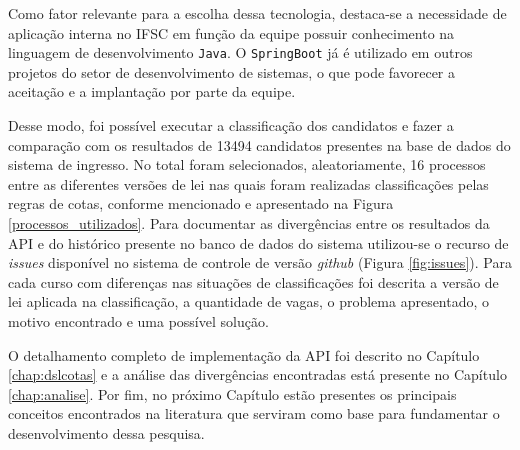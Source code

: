 Como fator relevante para a escolha dessa tecnologia, destaca-se a necessidade de aplicação interna no \gls{IFSC} em função da equipe possuir conhecimento na linguagem de desenvolvimento \texttt{Java}. O \texttt{SpringBoot} já é utilizado em outros projetos do setor de desenvolvimento de sistemas, o que pode favorecer a aceitação e a implantação por parte da equipe.

Desse modo, foi possível executar a classificação dos candidatos e fazer a comparação com os resultados de 13494 candidatos presentes na base de dados do sistema de ingresso. No total foram selecionados, aleatoriamente, 16 processos entre as diferentes versões de lei nas quais foram realizadas classificações pelas regras de cotas, conforme mencionado e apresentado na Figura \ref{processos_utilizados}. Para documentar as divergências entre os resultados da \gls{API} e do histórico presente no banco de dados do sistema utilizou-se o recurso de \textit{issues} disponível no sistema de controle de versão \textit{github} (Figura \ref{fig:issues}). Para cada curso com diferenças nas situações de classificações foi descrita a versão de lei aplicada na classificação, a quantidade de vagas, o problema apresentado, o motivo encontrado e uma possível solução.




O detalhamento completo de implementação da \gls{API} foi descrito no Capítulo \ref{chap:dslcotas} e a análise das divergências encontradas está presente no Capítulo \ref{chap:analise}. Por fim, no próximo Capítulo estão presentes os principais conceitos encontrados na literatura que serviram como base para fundamentar o desenvolvimento dessa pesquisa.
